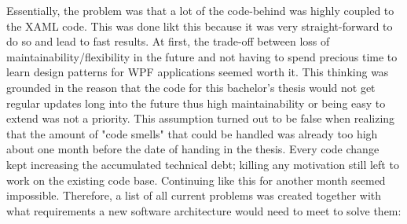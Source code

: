 Essentially, the problem was that a lot of the code-behind was highly coupled to the XAML code. This was done likt this because it was very straight-forward to do so and lead to fast results. At first, the trade-off between loss of maintainability/flexibility in the future and not having to spend precious time to learn design patterns for WPF applications seemed worth it. This thinking was grounded in the reason that the code for this bachelor's thesis would not get regular updates long into the future thus high maintainability or being easy to extend was not a priority. This assumption turned out to be false when realizing that the amount of "code smells" that could be handled was already too high about one month before the date of handing in the thesis. Every code change kept increasing the accumulated technical debt; killing any motivation still left to work on the existing code base. Continuing like this for another month seemed impossible. Therefore, a list of all current problems was created together with what requirements a new software architecture would need to meet to solve them:

